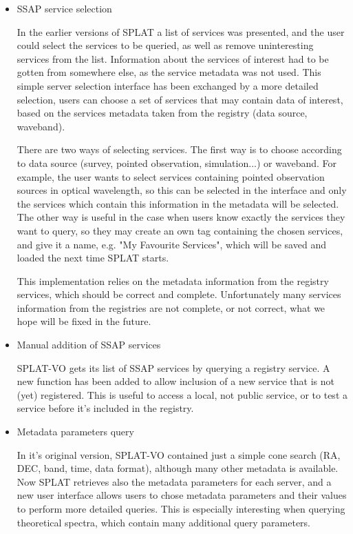 \documentclass[final,authoryear,5p,times,twocolumn]{elsarticle}
\begin{document}
\begin{itemize}
\item{ SSAP service selection}

  In the earlier versions of SPLAT a list of services was presented,
  and the user could select the services to be queried, as well as
  remove uninteresting services from the list. Information about the
  services of interest had to be gotten from somewhere else, as the
  service metadata was not used.  This simple server selection
  interface has been exchanged by a more detailed selection, users can
  choose a set of services that may contain data of interest, based on
  the services metadata taken from the registry (data source,
  waveband).

  There are two ways of selecting services. The first way is to choose
  according to data source (survey, pointed observation,
  simulation...) or waveband.  For example, the user wants to select
  services containing pointed observation sources in optical
  wavelength, so this can be selected in the interface and only the
  services which contain this information in the metadata will be
  selected.  The other way is useful in the case when users know
  exactly the services they want to query, so they may create an own
  tag containing the chosen services, and give it a name, e.g. "My
  Favourite Services", which will be saved and loaded the next time
  SPLAT starts.

  This implementation relies on the metadata information from the
  registry services, which should be correct and
  complete. Unfortunately many services information from the
  registries are not complete, or not correct, what we hope will be
  fixed in the future.



\item{Manual addition of SSAP services}

  SPLAT-VO gets its list of SSAP services by querying a registry
  service.  A new function has been added to allow inclusion of a new
  service that is not (yet) registered. This is useful to access a
  local, not public service, or to test a service before it's included
  in the registry.

\item{Metadata parameters query}

  In it's original version, SPLAT-VO contained just a simple cone
  search (RA, DEC, band, time, data format), although many other
  metadata is available.  Now SPLAT retrieves also the metadata
  parameters for each server, and a new user interface allows users to
  chose metadata parameters and their values to perform more detailed
  queries.  This is especially interesting when querying theoretical
  spectra, which contain many additional query parameters.


\end{itemize}
\end{document}
